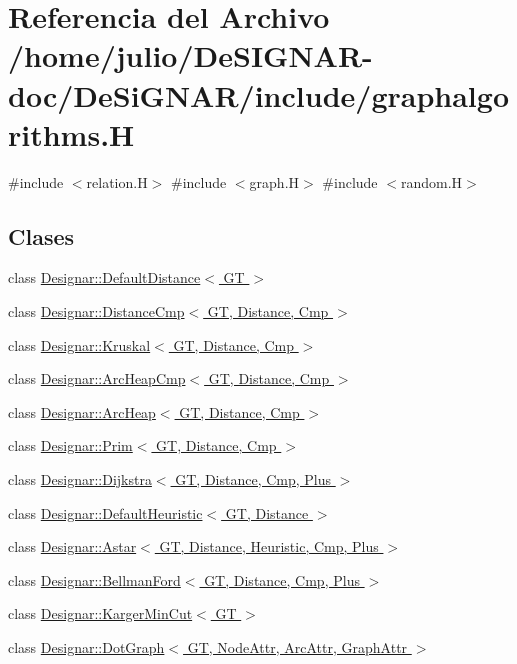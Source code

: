 \hypertarget{graphalgorithms_8_h}{}\section{Referencia del Archivo /home/julio/\+De\+S\+I\+G\+N\+A\+R-\/doc/\+De\+Si\+G\+N\+A\+R/include/graphalgorithms.H}
\label{graphalgorithms_8_h}
{\ttfamily \#include $<$relation.\+H$>$}\newline
{\ttfamily \#include $<$graph.\+H$>$}\newline
{\ttfamily \#include $<$random.\+H$>$}\newline
\subsection*{Clases}
\begin{DoxyCompactItemize}
\item 
class \hyperlink{class_designar_1_1_default_distance}{Designar\+::\+Default\+Distance$<$ G\+T $>$}
\item 
class \hyperlink{class_designar_1_1_distance_cmp}{Designar\+::\+Distance\+Cmp$<$ G\+T, Distance, Cmp $>$}
\item 
class \hyperlink{class_designar_1_1_kruskal}{Designar\+::\+Kruskal$<$ G\+T, Distance, Cmp $>$}
\item 
class \hyperlink{class_designar_1_1_arc_heap_cmp}{Designar\+::\+Arc\+Heap\+Cmp$<$ G\+T, Distance, Cmp $>$}
\item 
class \hyperlink{class_designar_1_1_arc_heap}{Designar\+::\+Arc\+Heap$<$ G\+T, Distance, Cmp $>$}
\item 
class \hyperlink{class_designar_1_1_prim}{Designar\+::\+Prim$<$ G\+T, Distance, Cmp $>$}
\item 
class \hyperlink{class_designar_1_1_dijkstra}{Designar\+::\+Dijkstra$<$ G\+T, Distance, Cmp, Plus $>$}
\item 
class \hyperlink{class_designar_1_1_default_heuristic}{Designar\+::\+Default\+Heuristic$<$ G\+T, Distance $>$}
\item 
class \hyperlink{class_designar_1_1_astar}{Designar\+::\+Astar$<$ G\+T, Distance, Heuristic, Cmp, Plus $>$}
\item 
class \hyperlink{class_designar_1_1_bellman_ford}{Designar\+::\+Bellman\+Ford$<$ G\+T, Distance, Cmp, Plus $>$}
\item 
class \hyperlink{class_designar_1_1_karger_min_cut}{Designar\+::\+Karger\+Min\+Cut$<$ G\+T $>$}
\item 
class \hyperlink{class_designar_1_1_dot_graph}{Designar\+::\+Dot\+Graph$<$ G\+T, Node\+Attr, Arc\+Attr, Graph\+Attr $>$}
\end{DoxyCompactItemize}
